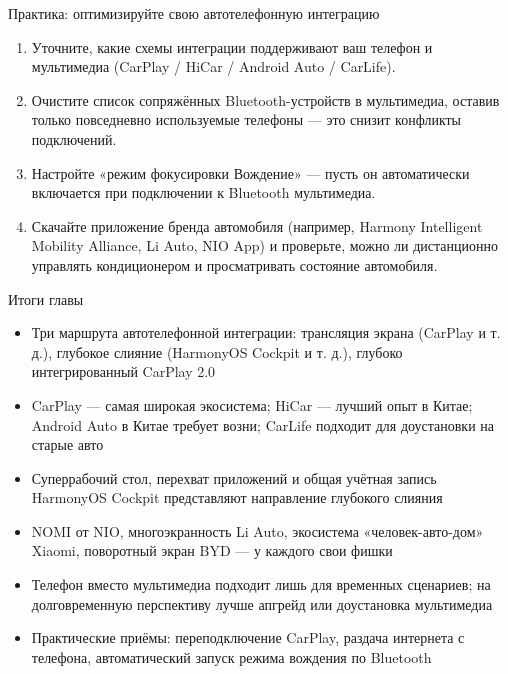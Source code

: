 \begin{tcbpractice}{Практика: оптимизируйте свою автотелефонную интеграцию}
\begin{enumerate}
  \item Уточните, какие схемы интеграции поддерживают ваш телефон и мультимедиа (CarPlay / HiCar / Android Auto / CarLife).
  \item Очистите список сопряжённых Bluetooth-устройств в мультимедиа, оставив только повседневно используемые телефоны — это снизит конфликты подключений.
  \item Настройте «режим фокусировки Вождение» — пусть он автоматически включается при подключении к Bluetooth мультимедиа.
  \item Скачайте приложение бренда автомобиля (например, Harmony Intelligent Mobility Alliance, Li Auto, NIO App) и проверьте, можно ли дистанционно управлять кондиционером и просматривать состояние автомобиля.
\end{enumerate}

\end{tcbpractice}

\begin{tcbsummary}{Итоги главы}
\begin{itemize}
  \item Три маршрута автотелефонной интеграции: трансляция экрана (CarPlay и т. д.), глубокое слияние (HarmonyOS Cockpit и т. д.), глубоко интегрированный CarPlay 2.0
  \item CarPlay — самая широкая экосистема; HiCar — лучший опыт в Китае; Android Auto в Китае требует возни; CarLife подходит для доустановки на старые авто
  \item Суперрабочий стол, перехват приложений и общая учётная запись HarmonyOS Cockpit представляют направление глубокого слияния
  \item NOMI от NIO, многоэкранность Li Auto, экосистема «человек-авто-дом» Xiaomi, поворотный экран BYD — у каждого свои фишки
  \item Телефон вместо мультимедиа подходит лишь для временных сценариев; на долговременную перспективу лучше апгрейд или доустановка мультимедиа
  \item Практические приёмы: переподключение CarPlay, раздача интернета с телефона, автоматический запуск режима вождения по Bluetooth
\end{itemize}

\end{tcbsummary}
